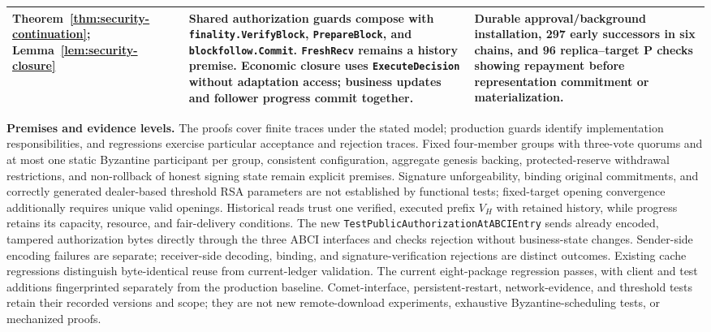 \begin{table}[t]
\begin{tabular}{@{}p{}
                    p{}
                    p{}@{}}
Theorem~\ref{thm:security-continuation};
Lemma~\ref{lem:security-closure} &
Shared authorization guards compose with
\texttt{finality.VerifyBlock}, \texttt{PrepareBlock}, and
\texttt{blockfollow.Commit}.
\texttt{FreshRecv} remains a history premise.
Economic closure uses \texttt{ExecuteDecision} without adaptation
access; business updates and follower progress commit together. &
Durable approval/background installation, 297 early successors in six
chains, and 96 replica--target P checks showing repayment before
representation commitment or materialization. \\

\bottomrule
\end{tabular}
\end{table}

\noindent\textbf{Premises and evidence levels.}
The proofs cover finite traces under the stated model; production
guards identify implementation responsibilities, and regressions
exercise particular acceptance and rejection traces.
Fixed four-member groups with three-vote quorums and at most one static
Byzantine participant per group, consistent configuration, aggregate
genesis backing, protected-reserve withdrawal restrictions, and
non-rollback of honest signing state remain explicit premises.
Signature unforgeability, binding original commitments, and correctly
generated dealer-based threshold RSA parameters are not established by
functional tests; fixed-target opening convergence additionally requires
unique valid openings.
Historical reads trust one verified, executed prefix $V_H$ with retained
history, while progress retains its capacity, resource, and fair-delivery
conditions.
The new \texttt{TestPublicAuthorizationAtABCIEntry} sends already encoded,
tampered authorization bytes directly through the three ABCI interfaces
and checks rejection without business-state changes.
Sender-side encoding failures are separate; receiver-side decoding,
binding, and signature-verification rejections are distinct outcomes.
Existing cache regressions distinguish byte-identical reuse from
current-ledger validation.
The current eight-package regression passes, with client and test
additions fingerprinted separately from the production baseline.
Comet-interface, persistent-restart, network-evidence, and threshold
tests retain their recorded versions and scope; they are not new
remote-download experiments, exhaustive Byzantine-scheduling tests,
or mechanized proofs.